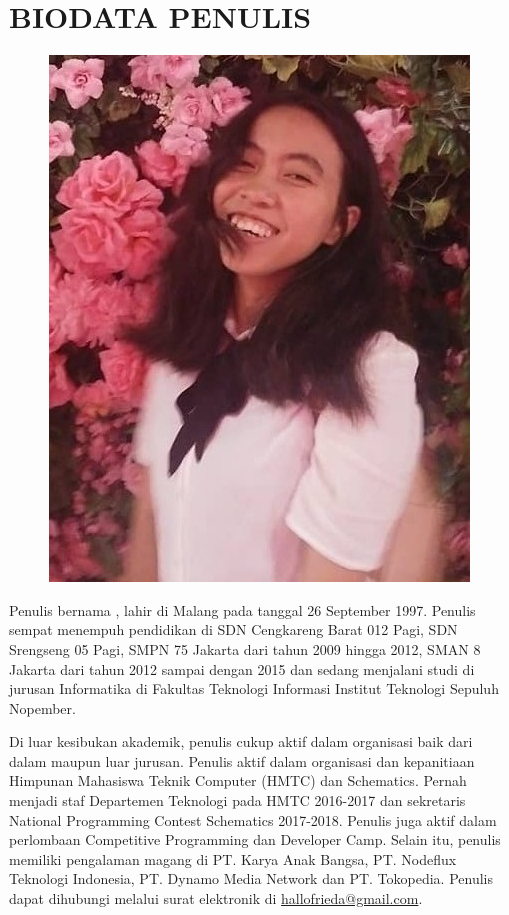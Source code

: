 
\chapter{BIODATA PENULIS}

\begin{figure}
	\includegraphics[height=0.25\textheight]{figures/frieda.jpg}
\end{figure}

Penulis bernama \penulis, lahir di Malang pada tanggal 26 September 1997. Penulis sempat menempuh pendidikan di SDN Cengkareng Barat 012 Pagi, SDN Srengseng 05 Pagi, SMPN 75 Jakarta dari tahun 2009 hingga 2012, SMAN 8 Jakarta dari tahun 2012 sampai dengan 2015 dan sedang menjalani studi di jurusan Informatika di Fakultas Teknologi Informasi Institut Teknologi Sepuluh Nopember.

Di luar kesibukan akademik, penulis cukup aktif dalam organisasi baik dari dalam maupun luar jurusan.
Penulis aktif dalam organisasi dan
kepanitiaan Himpunan Mahasiswa Teknik Computer (HMTC) dan Schematics. Pernah menjadi staf Departemen Teknologi pada HMTC 2016-2017 dan sekretaris National Programming Contest Schematics 2017-2018. Penulis juga aktif dalam perlombaan Competitive Programming dan Developer Camp. 
Selain itu, penulis memiliki pengalaman magang di PT. Karya Anak Bangsa, PT. Nodeflux Teknologi Indonesia, PT. Dynamo Media Network dan PT. Tokopedia. Penulis dapat dihubungi melalui surat elektronik di \href{mailto:hallofrieda@gmail.com}{hallofrieda@gmail.com}.